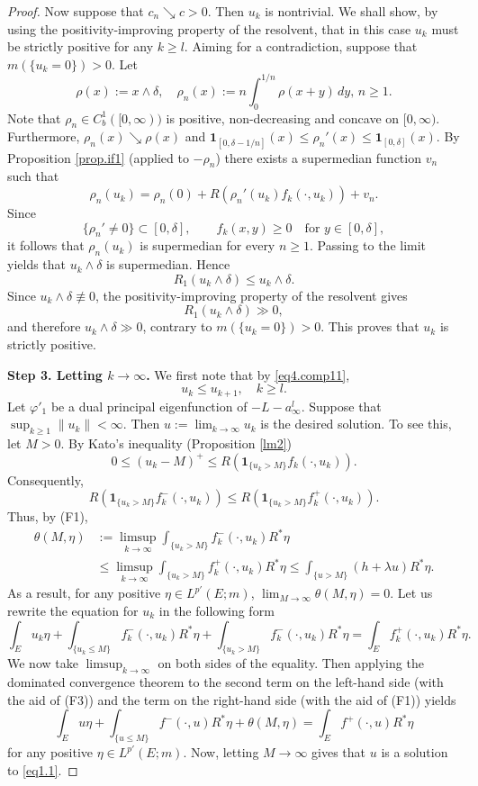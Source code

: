 \documentclass[11pt,a4paper,reqno]{amsart}
\theoremstyle{definition}
\numberwithin{equation}{section}
\begin{document}
\begin{proof}
Now suppose that $c_n\searrow c>0$. Then $u_k$ is nontrivial. We shall show, by using the positivity-improving
 property of the resolvent,
that in this case $u_k$ must be  strictly positive for any $k\ge l$. Aiming for a contradiction, suppose that 
$m(\{u_k=0\})>0$.
Let 
\[
\rho(x):=x\wedge \delta,\quad \rho_n(x):= n\int_0^{1/n} \rho(x+y)\,dy,\, n\ge 1.
\]
Note that  $\rho_n\in C^1_b([0,\infty))$ is  positive, non-decreasing and concave
on $[0,\infty)$. Furthermore,  $\rho_n(x)\searrow \rho(x)$ and $\mathbf1_{[0,\delta-1/n]}(x)\le \rho_n'(x)\le \mathbf1_{[0,\delta]}(x)$.
By Proposition \ref{prop.if1} (applied to $-\rho_n$) there exists a supermedian function $v_n$ such that 
\[
\rho_n(u_k)=\rho_n(0)+R(\rho_n'(u_k)f_k(\cdot,u_k))+v_n.
\]
Since
\[
\{\rho_n'\ne0\}\subset[0,\delta],
\qquad
f_k(x,y)\ge0
\quad\text{for }y\in[0,\delta],
\]
it follows that $\rho_n(u_k)$ is supermedian for every $n\ge1$. Passing to the limit yields that $u_k\wedge\delta$ is supermedian. 
Hence
\[
R_1(u_k\wedge\delta)\le u_k\wedge\delta.
\]
Since  $u_k\wedge\delta\not\equiv0$, the positivity-improving property of the resolvent gives
\[
R_1(u_k\wedge\delta)\gg0,
\]
and therefore $u_k\wedge\delta\gg0$, contrary to
$m(\{u_k=0\})>0$. This proves that $u_k$ is strictly positive.

{\bf Step 3. Letting $k\to \infty$.} 
We first note   that by \eqref{eq4.comp11},
\begin{equation}
\label{eq4.comp12}
u_{k}\le u_{k+1},\quad k\ge l.
\end{equation}
Let $\varphi'_1$ be a dual principal eigenfunction of  $-L-a_\infty^l$. 
Suppose that $\sup_{k\ge 1}\|u_k\|<\infty$. Then $u:=\lim_{k\to \infty} u_k$
is the desired solution. To see this, let $M>0$.  By Kato's inequality (Proposition \ref{lm2}) 
\[
0\le (u_k-M)^+\le R(\mathbf1_{\{u_k>M\}}f_k(\cdot,u_k)).
\]
Consequently,
\[
R(\mathbf1_{\{u_k>M\}}f^-_k(\cdot,u_k))\le R(\mathbf1_{\{u_k>M\}}f^+_k(\cdot,u_k)).
\]
Thus, by (F1),
\[
\begin{split}
\theta(M,\eta)&:=\limsup_{k\to \infty}\int_{\{u_k> M\}} f^-_k(\cdot,u_k) R^*\eta
\\&\le \limsup_{k\to \infty} \int_{\{u_k>M\}} f^+_k(\cdot,u_k) R^*\eta\le  \int_{\{u> M\}} (h+\lambda u) R^*\eta.
\end{split}
\]
As a result, for any positive $\eta\in L^{p'}(E;m)$, $\lim_{M\to\infty} \theta(M,\eta)=0$. 
Let us rewrite the equation for $u_k$ in the following form
\[
\int_{ E} u_k\eta+\int_{\{u_k\le M\}} f^-_k(\cdot,u_k) R^*\eta+\int_{\{u_k> M\}} f^-_k(\cdot,u_k) R^*\eta
=\int_{ E} f^+_k(\cdot,u_k) R^*\eta.
\]
We now take   $\limsup_{k\to \infty}$ on both sides of the equality. Then applying the dominated convergence theorem
to the second term on the left-hand side (with the aid of (F3)) and the term on the right-hand side (with the aid of (F1))   yields
\[
\int_{ E} u\eta+\int_{\{u\le M\}} f^-(\cdot,u) R^*\eta+\theta(M,\eta)=\int_{ E} f^+(\cdot,u) R^*\eta
\]
for any positive $\eta\in L^{p'}(E;m)$.   Now, letting $M\to \infty$ gives that $u$ is a solution to \eqref{eq1.1}.


\end{proof}
\end{document}

